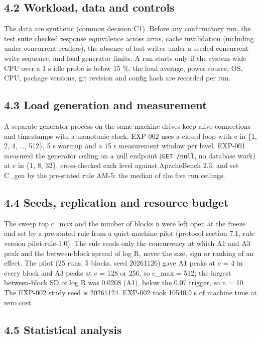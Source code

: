 \documentclass[
]{article}
\begin{document}
\subsection{4.2 Workload, data and
controls}\label{workload-data-and-controls}

The data are synthetic (common decision C1). Before any confirmatory
run, the test suite checked response equivalence across arms, cache
invalidation (including under concurrent readers), the absence of lost
writes under a seeded concurrent write sequence, and load-generator
limits. A run starts only if the system-wide CPU over a 1 s idle probe
is below 15 \%; the load average, power source, OS, CPU, package
versions, git revision and config hash are recorded per run.

\subsection{4.3 Load generation and
measurement}\label{load-generation-and-measurement}

A separate generator process on the same machine drives keep-alive
connections and timestamps with a monotonic clock. EXP-002 uses a closed
loop with c in \{1, 2, 4, \ldots, 512\}, 5 s warmup and a 15 s
measurement window per level. EXP-001 measured the generator ceiling on
a null endpoint (\texttt{GET\ /null}, no database work) at c in \{1, 8,
32\}, cross-checked each level against ApacheBench 2.3, and set C\_gen
by the pre-stated rule AM-5: the median of the five run ceilings.

\subsection{4.4 Seeds, replication and resource
budget}\label{seeds-replication-and-resource-budget}

The sweep top c\_max and the number of blocks n were left open at the
freeze and set by a pre-stated rule from a quiet-machine pilot (protocol
section 7.1, rule version pilot-rule-1.0). The rule reads only the
concurrency at which A1 and A3 peak and the between-block spread of log
R, never the size, sign or ranking of an effect. The pilot (25 runs, 5
blocks, seed 20261126) gave A1 peaks at c = 4 in every block and A3
peaks at c = 128 or 256, so c\_max = 512; the largest between-block SD
of log R was 0.0208 (A1), below the 0.07 trigger, so n = 10. The EXP-002
study seed is 20261124. EXP-002 took 10540.9 s of machine time at zero
cost.

\subsection{4.5 Statistical analysis}\label{statistical-analysis}
\end{document}
